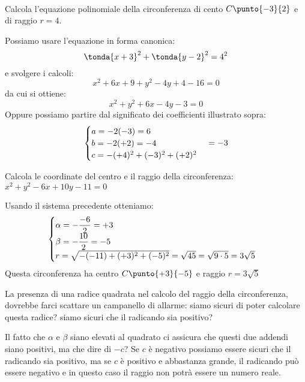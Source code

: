 \begin{esempio}
~

\noindent\begin{minipage}{.55\textwidth}
Calcola l'equazione polinomiale della circonferenza di cento \(C\punto{-3}{2}\) 
e di raggio \(r=4\).

Possiamo usare l'equazione in forma canonica:
\[\tonda{x+3}^2 + \tonda{y-2}^2 = 4^2\]
e svolgere i calcoli:
\[x^2 +6x+9 +y^2 -4y +4 -16 = 0\]
da cui si ottiene:
\[x^2 +y^2 +6x -4y -3 = 0\]
Oppure possiamo partire dal significato dei coefficienti illustrato sopra:
\[\begin{cases}a = -2(-3)=6 \\ b = -2(+2)=-4 \\ c = -(+4)^2 +(-3)^2 +(+2)^2\end{cases}=-3\]
\end{minipage}
\hfill
\begin{minipage}{.43\textwidth}
\begin{center}
\begin{inaccessibleblock}
  \circtraslata
\end{inaccessibleblock}
\end{center}
\end{minipage}
\end{esempio}

\begin{esempio}
Calcola le coordinate del centro e il raggio della circonferenza:
\(x^2 +y^2 -6x + 10y -11 = 0\)

Usando il sistema precedente otteniamo:
\[\begin{cases}\alpha = -\dfrac{-6}{2} = +3\\ 
           \beta = -\dfrac{10}{2} = -5 \\ 
           r = \sqrt{-(-11) +(+3)^2 + (-5)^2} = \sqrt{45}= 
               \sqrt{9 \cdot 5} = 3\sqrt{5}\end{cases}\]
Questa circonferenza ha centro \(C\punto{+3}{-5}\) e raggio \(r=3\sqrt{5}\)
\end{esempio}

\begin{osservazione}
La presenza di una radice quadrata nel calcolo del raggio della circonferenza, 
dovrebbe farci scattare un campanello di allarme: siamo sicuri di poter 
calcolare questa radice? siamo sicuri che il radicando sia positivo?

Il fatto che \(\alpha\) e \(\beta\) siano elevati al quadrato ci assicura che 
questi due addendi siano positivi, ma che dire di \(-c\)? Se \(c\) è negativo 
possiamo essere sicuri che il radicando sia positivo, ma se \(c\) è positivo e 
abbastanza grande, il radicando può essere negativo e in questo caso il raggio 
non potrà essere un numero reale.
\end{osservazione}

